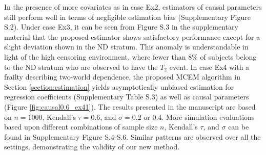 \documentclass[APA,Times1COL]{WileyNJDv5} %
\theoremstyle{plain}
\begin{document}
In the presence of more covariates as in case Ex2, estimators of causal parameters still perform well in terms of negligible estimation bias (Supplementary Figure S.2). Under case Ex3, it can be seen from Figure S.3 in the supplementary material that the proposed estimator shows satisfactory performance except for a slight deviation shown in the ND stratum. 
This anomaly is understandable in light of the high censoring environment, where fewer than $8\%$ of subjects belong to the ND stratum who are observed to have the $T_2$ event. 
In case Ex4 with a frailty describing two-world dependence, the proposed MCEM algorithm in Section \ref{section:estimation} yields asymptotically unbiased estimation for regression coefficients (Supplementary Table S.3) as well as causal parameters (Figure \ref{fig:causal0.6_ex41}). The results presented in the manuscript are based on $n=1000$, Kendall's $\tau=0.6$, and $\sigma = 0.2$ or $0.4$. More simulation evaluations based upon different combinations of sample size $n$, Kendall's $\tau$, and $\sigma$ can be found in Supplementary Figure S.4-S.6. Similar patterns are observed over all the settings, demonstrating the validity of our new method.



\end{document}
